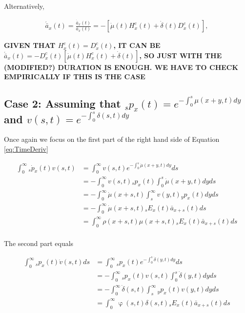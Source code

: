 \documentclass[12pt]{article}
\begin{document}
Alternatively,


\begin{equation}\label{eq:TimeDerivCA}
\begin{split}
\acute{\bar{a}}_x(t) =\frac{\dot{\bar{a}}_x(t)}{\bar{a}_x(t)}= -[\dot{\mu}(t) H^{c}_x(t)+\dot{\delta}(t)  D^{c}_x(t)],
\end{split}
\end{equation}



\textbf{GIVEN THAT $H^{c}_x(t)=D^{c}_x(t)$, IT CAN BE $\acute{\bar{a}}_x(t) = -D^{c}_x(t)[\dot{\mu}(t) H^{c}_x(t)+\dot{\delta}(t)]$, SO JUST WITH THE (MODIFIED?) DURATION IS ENOUGH. WE HAVE TO CHECK EMPIRICALLY IF THIS IS THE CASE}

\subsection{Case 2: Assuming that $_sp_x(t)=e^{-\int_{0}^{s}\mu(x+y,t)dy}$ and  ${v}(s,t)=e^{-\int_{0}^{s}\delta(s,t)dy}$}

Once again we focus on the first part of the right hand side of Equation \ref{eq:TimeDeriv}

\begin{equation}\label{eq:TimeDerivP1}
\begin{split}
\int_0^\infty {}_s\dot{p}_x(t) v(s,t) &= \int_0^\infty   v(s,t) e^{-\int_0^{s}\dot{\mu}(x+y,t)dy}ds\\
&= -\int_0^\infty   v(s,t) {}_sp_x(t)\int_0^{s}\dot{\mu}(x+y,t)dyds\\
&= -\int_0^\infty  \dot{\mu}(x+s,t) \int_s^{\infty} v(y,t) {}_yp_x(t) dyds\\
&= - \int_0^\infty \dot{\mu}(x+s,t)   {}_sE_x(t) \bar{a} _{x+s}(t) ds\\
&= \int_0^\infty \rho(x+s,t) \mu(x+s,t)   {}_sE_x(t) \bar{a} _{x+s}(t) ds\\
\end{split}
\end{equation}


The second part equals

\begin{equation}\label{eq:TimeDerivP2}
\begin{split}
\int_0^\infty {}_sp_x(t) \dot{v}(s,t)ds &= \int_0^\infty {}_sp_x(t)  e^{-\int_0^{s}\dot{\delta}(y,t)dy}ds\\
&= -\int_0^\infty {}_sp_x(t) v(s,t) \int_0^{s}\dot{\delta}(y,t)dy ds\\
&= -\int_0^\infty  \dot{\delta}(s,t)\int_s^{\infty} {}_yp_x(t) v(y,t) dy ds\\
&= \int_0^\infty  \upvarphi(s,t) \delta(s,t)  {}_sE_x(t) \bar{a} _{x+s}(t) ds\\
\end{split}
\end{equation}
\end{document}
